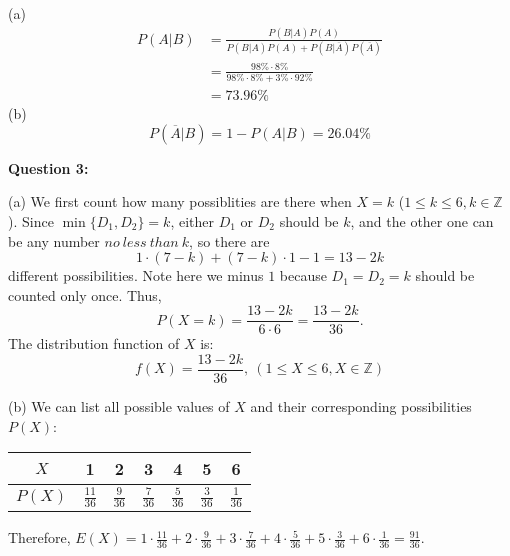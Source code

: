 \documentclass[a4paper,11pt]{article}
\begin{document}
\begin{spacing}{1.4}
    (a)
    \begin{align*}
        P(A|B)&=\frac{P(B|A)P(A)}
            {P(B|A)P(A)+P(B|\overline{A})P(\overline{A})}\\
            &=\frac{98\%\cdot 8\%}{98\%\cdot 8\%+3\%\cdot 92\%}\\
            &=73.96\%
    \end{align*} 
    (b)
    $$P(\overline{A}|B)=1-P(A|B)=26.04\%$$


    \textbf{Question 3:}

    \hspace{2em}
    (a) We first count how many possiblities are there when 
    $X=k$ ($1\le k\le 6, k\in \mathbb{Z}$). 
    Since $\min\{ D_1,D_2 \}=k$, either $D_1$ or $D_2$ 
    should be $k$, and the other one can be any number 
    $no\ less\ than\ k$, so there are
    $$1\cdot (7-k) + (7-k) \cdot 1 -1=13-2k$$ different possibilities.
    Note here we minus $1$ because $D_1=D_2=k$ should be counted
    only once. Thus,
    $$P(X=k)=\frac{13-2k}{6\cdot 6}=\frac{13-2k}{36}.$$
    The distribution function of $X$ is:
    $$f(X)=\frac{13-2k}{36},\ (1\le X\le 6, X\in \mathbb{Z})$$

    
    (b) We can list all possible values of $X$ and their corresponding
    possibilities $P(X)$:

    \begin{center}
        \begin{tabular}{c|c|c|c|c|c|c}
            \hline
            $X$ & 1 & 2 & 3 & 4 & 5 & 6\\\hline
            $P(X)$ & $\frac{11}{36}$ & $\frac{9}{36}$ & $\frac{7}{36}$&
            $\frac{5}{36}$ & $\frac{3}{36}$ & $\frac{1}{36}$\\\hline 
        \end{tabular}
    \end{center}

    Therefore, $\displaystyle
    E(X)=1\cdot \frac{11}{36}+2\cdot \frac{9}{36} +
    3\cdot \frac{7}{36} +4\cdot \frac{5}{36} 
    +5\cdot \frac{3}{36}+6\cdot \frac{1}{36}=\frac{91}{36}.$


\end{spacing}
\end{document}
